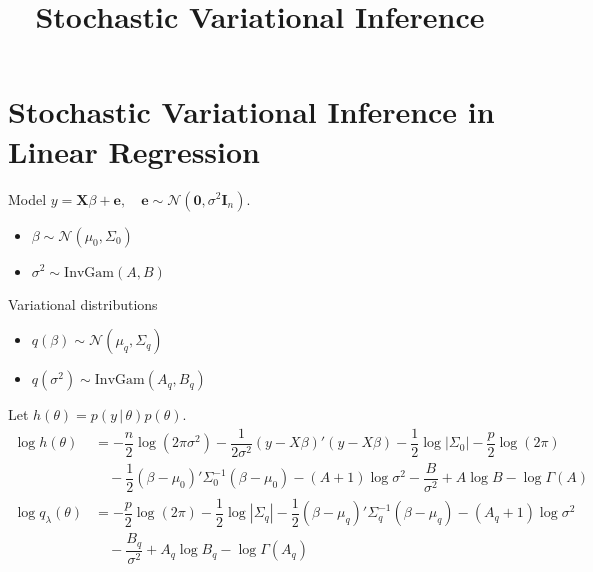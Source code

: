\documentclass[12pt]{article}
\begin{document}
\title{Stochastic Variational Inference}

\section{Stochastic Variational Inference in Linear Regression}
Model $y=\mathbf{X}\beta+\mathbf{e},\quad \mathbf{e}\sim\mathcal{N}(\mathbf{0},\sigma^{2}\mathbf{I}_{n})$.
\begin{itemize}
  \item $\beta\sim\mathcal{N}\left(\mu_{0},\Sigma_{0}\right)$
  \item $\sigma^{2}\sim\mathrm{InvGam}(A,B)$
\end{itemize}
Variational distributions
\begin{itemize}
  \item $q(\beta)\sim\mathcal{N}\left(\mu_{q},\Sigma_{q}\right)$
  \item $q\left(\sigma^{2}\right)\sim\mathrm{InvGam}\left(A_{q},B_{q}\right)$
\end{itemize}
Let $h(\theta)=p(y\,|\,\theta)p(\theta)$.
\begin{align}
  \log h(\theta) &= -\dfrac{n}{2}\log\left(2\pi\sigma^{2}\right)-\dfrac{1}{2\sigma^{2}}\left(y-X\beta\right)'\left(y-X\beta\right)-\dfrac{1}{2}\log\left|\Sigma_{0}\right|-\dfrac{p}{2}\log(2\pi)\\
  &\quad -\dfrac{1}{2}\left(\beta-\mu_{0}\right)'\Sigma_{0}^{-1}\left(\beta-\mu_{0}\right)-(A+1)\log\sigma^{2}-\dfrac{B}{\sigma^{2}}+A\log B -\log\Gamma(A)\\
  \log q_{\lambda}(\theta) &= -\dfrac{p}{2}\log(2\pi)-\dfrac{1}{2}\log\left|\Sigma_{q}\right|-\dfrac{1}{2}\left(\beta-\mu_{q}\right)'\Sigma_{q}^{-1}\left(\beta-\mu_{q}\right)-\left(A_{q}+1\right)\log\sigma^{2}\\
  &\quad -\dfrac{B_{q}}{\sigma^{2}}+A_{q}\log B_{q}-\log\Gamma\left(A_{q}\right)
\end{align}
\end{document}
